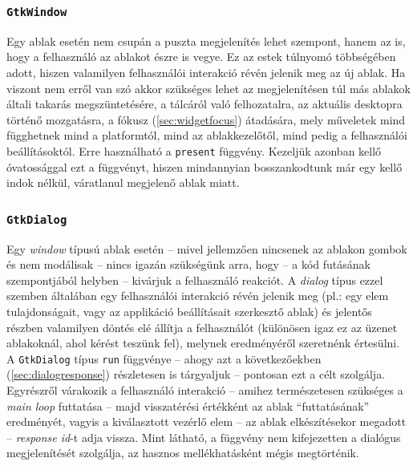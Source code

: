 \subsubsection{\texttt{GtkWindow}}

Egy ablak esetén nem csupán a puszta megjelenítés lehet szempont, hanem az is, hogy a felhasználó az ablakot észre is vegye. Ez az estek túlnyomó többségében adott, hiszen valamilyen felhasználói interakció révén jelenik meg az új ablak. Ha viszont nem erről van szó akkor szükséges lehet az megjelenítésen túl más ablakok általi takarás megszüntetésére, a tálcáról való felhozatalra, az aktuális desktopra  történő mozgatásra, a fókusz (\ref{sec:widgetfocus}) átadására, mely műveletek mind függhetnek mind a platformtól, mind az ablakkezelőtől, mind pedig a felhasználói beállításoktól. Erre használható a \texttt{present} függvény. Kezeljük azonban kellő óvatossággal ezt a függvényt, hiszen mindannyian bosszankodtunk már egy kellő indok nélkül, váratlanul megjelenő ablak miatt.

\subsubsection{\texttt{GtkDialog}}

Egy \textit{window} típusú ablak esetén -- mivel jellemzően nincsenek az ablakon gombok és nem modálisak -- nincs igazán szükségünk arra, hogy -- a kód futásának szempontjából helyben -- kivárjuk a felhasználó reakciót. A \textit{dialog} típus ezzel szemben általában egy felhasználói interakció révén jelenik meg (pl.: egy elem tulajdonságait, vagy az applikáció beállításait szerkesztő ablak) és jelentős részben valamilyen döntés elé állítja a felhasználót (különösen igaz ez az üzenet ablakoknál, ahol kérést teszünk fel), melynek eredményéről szeretnénk értesülni. A \texttt{GtkDialog} típus \texttt{run} függvénye -- ahogy azt a következőekben (\ref{sec:dialogresponse}) részletesen is tárgyaljuk -- pontosan ezt a célt szolgálja. Egyrészről várakozik a felhasználó interakció -- amihez természetesen szükséges a \textit{main loop} futtatása -- majd visszatérési értékként az ablak ``futtatásának'' eredményét, vagyis a kiválasztott vezérlő elem -- az ablak elkészítésekor megadott -- \textit{response id}-t adja vissza. Mint látható, a függvény nem kifejezetten a dialógus megjelenítését szolgálja, az hasznos mellékhatásként mégis megtörténik.

